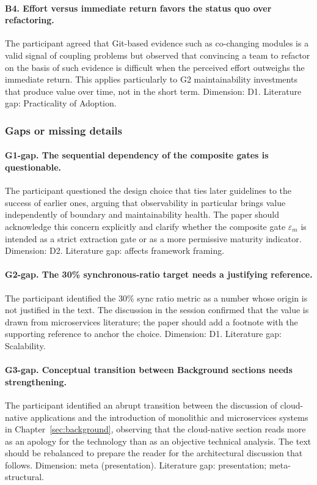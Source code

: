 \paragraph*{B4. Effort versus immediate return favors the status quo over refactoring.} The participant agreed that Git-based evidence such as co-changing modules is a valid signal of coupling problems but observed that convincing a team to refactor on the basis of such evidence is difficult when the perceived effort outweighs the immediate return. This applies particularly to G2 maintainability investments that produce value over time, not in the short term. Dimension: D1. Literature gap: Practicality of Adoption.

\subsubsection*{Gaps or missing details}

\paragraph*{G1-gap. The sequential dependency of the composite gates is questionable.} The participant questioned the design choice that ties later guidelines to the success of earlier ones, arguing that observability in particular brings value independently of boundary and maintainability health. The paper should acknowledge this concern explicitly and clarify whether the composite gate $\varepsilon_m$ is intended as a strict extraction gate or as a more permissive maturity indicator. Dimension: D2. Literature gap: affects framework framing.

\paragraph*{G2-gap. The 30\% synchronous-ratio target needs a justifying reference.} The participant identified the 30\% sync ratio metric as a number whose origin is not justified in the text. The discussion in the session confirmed that the value is drawn from microservices literature; the paper should add a footnote with the supporting reference to anchor the choice. Dimension: D1. Literature gap: Scalability.

\paragraph*{G3-gap. Conceptual transition between Background sections needs strengthening.} The participant identified an abrupt transition between the discussion of cloud-native applications and the introduction of monolithic and microservices systems in Chapter~\ref{sec:background}, observing that the cloud-native section reads more as an apology for the technology than as an objective technical analysis. The text should be rebalanced to prepare the reader for the architectural discussion that follows. Dimension: meta (presentation). Literature gap: presentation; meta-structural.

